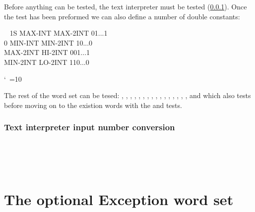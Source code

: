 Before anything can be tested, the text interpreter must be
tested (\ref{test:dbl:in}).
Once the \linebreak {} test has been preformed
we can also define a number of double constants:

\begin{tt}\frenchspacing\obeyspaces
~     1S MAX-INT  MAX-2INT    01...1 \\\mbox{}
      0 MIN-INT  MIN-2INT    10...0 \\
MAX-2INT        HI-2INT     001...1 \\
MIN-2INT        LO-2INT     110...0
\end{tt}
\nonfrenchspacing\catcode`\ =10

The rest of the word set can be tesed:
,
, ,
, ,
, ,
, ,
, ,
, , \linebreak
{}, ,
,  and
 which also tests  before moving on
to the existion words with the
 and  tests.

\setcounter{subsection}{3}
\setcounter{subsubsection}{1}
\subsubsection{Text interpreter input number conversion}
\label{test:dbl:in}

 \\
 \\
 \\



\section{The optional Exception word set} %

